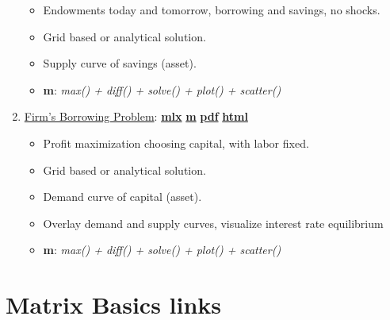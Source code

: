 \documentclass[
]{book}
\providecommand{\tightlist}{%
  \setlength{\itemsep}{0pt}\setlength{\parskip}{0pt}}
\begin{document}
\begin{enumerate}
  \begin{itemize}
  \tightlist
  \item
    Endowments today and tomorrow, borrowing and savings, no shocks.
  \item
    Grid based or analytical solution.
  \item
    Supply curve of savings (asset).
  \item
    \textbf{m}: \emph{max() + diff() + solve() + plot() + scatter()}
  \end{itemize}
\item
  \href{https://Math4Econ.github.io/derivative_application/htmlpdfm/K_borrow_firm.html}{Firm's Borrowing Problem}: \href{https://github.com/Math4Econ/Math4Econ.github.io/blob/main/derivative_application/K_borrow_firm.mlx}{\textbf{mlx}} \textbar{} \href{https://github.com/Math4Econ/Math4Econ.github.io/blob/main/derivative_application/htmlpdfm/K_borrow_firm.m}{\textbf{m}} \textbar{} \href{https://github.com/Math4Econ/Math4Econ.github.io/blob/main/derivative_application/htmlpdfm/K_borrow_firm.pdf}{\textbf{pdf}} \textbar{} \href{https://Math4Econ.github.io/derivative_application/htmlpdfm/K_borrow_firm.html}{\textbf{html}}

  \begin{itemize}
  \tightlist
  \item
    Profit maximization choosing capital, with labor fixed.
  \item
    Grid based or analytical solution.
  \item
    Demand curve of capital (asset).
  \item
    Overlay demand and supply curves, visualize interest rate equilibrium
  \item
    \textbf{m}: \emph{max() + diff() + solve() + plot() + scatter()}
  \end{itemize}
\end{enumerate}

\hypertarget{matrix-basics-links}{%
\section{Matrix Basics links}\label{matrix-basics-links}}
\end{document}
